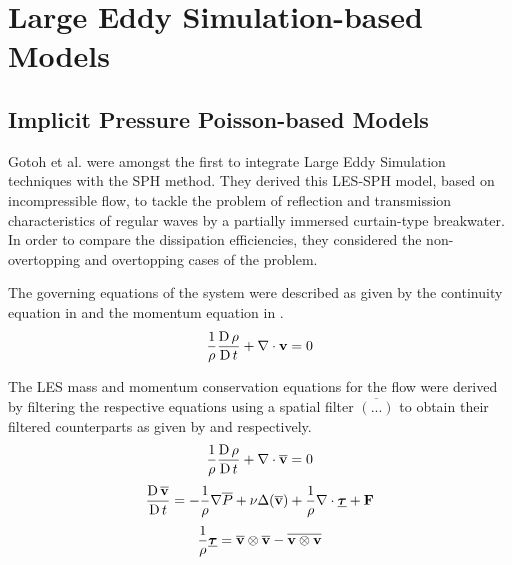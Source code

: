 \section{Large Eddy Simulation-based Models}
\label{sec:les-based-model}
\subsection{Implicit Pressure Poisson-based Models}
\label{sec:Implicit-Pressure-Poisson-based-Models}
Gotoh et al. \parencite{Gotoh2004} were amongst the first to integrate Large Eddy Simulation techniques with the SPH method. They derived this LES-SPH model, based on incompressible flow, to tackle the problem of reflection and transmission characteristics of regular waves by a partially immersed curtain-type breakwater. In order to compare the dissipation efficiencies, they considered the non-overtopping and overtopping cases of the problem.

The governing equations of the system were described as given by the continuity equation in  and the momentum equation in .
\begin{equation}
    \frac{1}{\rho} \frac{\operatorname{D} \rho}{\operatorname{D} t} + \nabla \cdot \mathbf{v} = 0
    \label{eq:Gotoh2004-continuity-governing}
\end{equation}

The LES mass and momentum conservation equations for the flow were derived by filtering the respective equations using a spatial filter $\overline{(...)}$ to obtain their filtered counterparts as given by  and  respectively.
\begin{equation}
    \frac{1}{\rho} \frac{\operatorname{D} \rho}{\operatorname{D} t} + \nabla \cdot \mathbf{\overline{v}} = 0
    \label{eq:Gotoh2004-continuity-filtered}
\end{equation}
\begin{equation}
    \frac{\operatorname{D} \mathbf{\overline{v}}}{\operatorname{D} t} = -\frac{1}{\rho}\nabla \overline{P} + \nu \Delta ( \mathbf{\overline{v}} ) + \frac{1}{\rho}\nabla\cdot\underline{\bm{\tau}} + \mathbf{F}
    \label{eq:Gotoh2004-mom-filtered}
\end{equation}
\begin{equation}
    \frac{1}{\rho} \underline{\bm{\tau}} = \mathbf{\overline{v}} \otimes \mathbf{\overline{v}} - \overline{\mathbf{v} \otimes \mathbf{v}}
    \label{eq:Gotoh2004-stress-tensor}
\end{equation}

